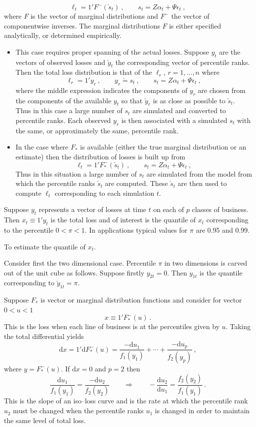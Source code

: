 \documentclass[a4paper,12pt]{article}
\newcommand{\eps}{\epsilon}
\newcommand{\de}{\mathrm{d}}
\begin{document}
$$
\ell_t=1'F^-(\check s_t)\ , \qquad s_t=Z\alpha_t+\Psi\eps_t\ ,
$$
where $F$ is the vector of marginal distributions and $F^-$ the vector of componentwise inverses.  The marginal distributions $F$ is either specified analytically, or determined empirically.
 \begin{itemize}
   \item This case requires proper spanning of the actual losses. Suppose $y_t$ are the vectors of observed losses and $\check y_t$ the corresponding vector of percentile ranks.  Then the total loss distribution is that of the $\ell_r$, $r=1,\ldots,n$ where
$$
\ell_r = 1'y_r\ ,\qquad y_r \check = s_t\ , \qquad s_t=Z\alpha_t+\Psi\eps_t\ ,
$$
where the middle expression indicates the components of $y_r$ are chosen from the components of the available $y_t$ so that $\check y_r$ is as close as possible to $\check s_t$.  Thus in this case a large number of $s_t$ are simulated and converted to percentile ranks.   Each observed $y_r$ is then associated with a simulated $s_t$ with the same, or approximately the same, percentile rank.

   \item  In the case where $F_*$ is available (either the true marginal distribution or an estimate) then the distribution of losses is built up from
       $$
       \ell_t =1'F_*^-(\check s_t)\ , \qquad s_t=Z\alpha_t+\Psi\eps_t\ ,
       $$
       Thus in this situation a large number of $s_t$ are simulated from the model from which the percentile ranks $\check s_t$ are computed.   These $\check s_t$ are then used to compute $\ell_t$ corresponding to each simulation $t$.
 \end{itemize}




Suppose $y_t$ represents a vector of losses at time $t$ on each of $p$ classes of business.   Then $x_t\equiv 1'y_t$ is the total loss and of interest is the quantile of $x_t$ corresponding to the percentile $0<\pi<1$.  In applications typical values for $\pi$ are 0.95 and 0.99.

To estimate the quantile of $x_t$.

Consider first the two dimensional case.  Percentile $\pi$ in two dimensions is carved out of the unit cube as follows.  Suppose firstly $y_{2t}=0$.  Then $y_{1t}$ is the quantile corresponding to $\check y_{1t}=\pi$.

Suppose $F_*$ is vector or marginal distribution functions and consider for vector $0<u<1$
$$
x\equiv 1'F_*^-(u)\ .
$$
This is the loss when each line of business is at the percentiles given by $u$.  Taking the total differential yields
$$
\de x = 1'\de F_*^-(u) = \frac{-\de u_1}{f_1(y_1)}+\cdots +\frac{-\de u_p}{f_2(y_p)}\ ,
$$
where $y=F_*^-(u)$.  If $\de x=0$ and $p=2$ then
$$
\frac{\de u_1}{f_1(y_1)}=\frac{-\de u_2}{f_2(y_2)}\qquad\Rightarrow\qquad
-\frac{\de u_2}{\de u_1} = \frac{f_2(y_2)}{f_1(y_1)}\ .
$$
This is the slope of an iso--loss curve and is the rate at which the percentile rank $u_2$ must be changed when the percentile ranks $u_1$ is changed in order to maintain the same level of total loss.
\end{document}
